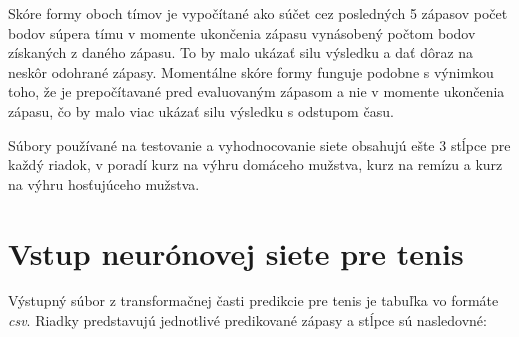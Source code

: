 Skóre formy oboch tímov je vypočítané ako súčet cez posledných 5 zápasov počet bodov súpera tímu v momente ukončenia zápasu vynásobený počtom bodov získaných z daného zápasu.
To by malo ukázať silu výsledku a dať dôraz na neskôr odohrané zápasy.
Momentálne skóre formy funguje podobne s výnimkou toho, že je prepočítavané pred evaluovaným zápasom a nie v momente ukončenia zápasu, čo by malo viac ukázať silu výsledku s odstupom času.

Súbory používané na testovanie a vyhodnocovanie siete obsahujú ešte 3 stĺpce pre každý riadok, v poradí kurz na výhru domáceho mužstva, kurz na remízu a kurz na výhru hosťujúceho mužstva.


\section{Vstup neurónovej siete pre tenis} \label{in:ten}
Výstupný súbor z transformačnej časti predikcie pre tenis je tabuľka vo formáte \textit{csv}. Riadky predstavujú jednotlivé predikované zápasy a stĺpce sú nasledovné:

